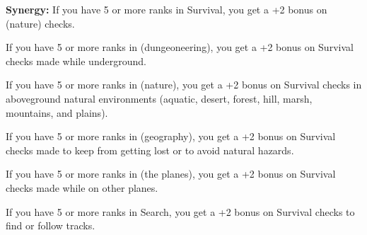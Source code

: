 \textbf{Synergy:} If you have 5 or more ranks in Survival, you get a +2 bonus on  (nature) checks.

If you have 5 or more ranks in  (dungeoneering), you get a +2 bonus on Survival checks made while underground.

If you have 5 or more ranks in  (nature), you get a +2 bonus on Survival checks in aboveground natural environments (aquatic, desert, forest, hill, marsh, mountains, and plains).

If you have 5 or more ranks in  (geography), you get a +2 bonus on Survival checks made to keep from getting lost or to avoid natural hazards.

If you have 5 or more ranks in  (the planes), you get a +2 bonus on Survival checks made while on other planes.

If you have 5 or more ranks in Search, you get a +2 bonus on Survival checks to find or follow tracks.

